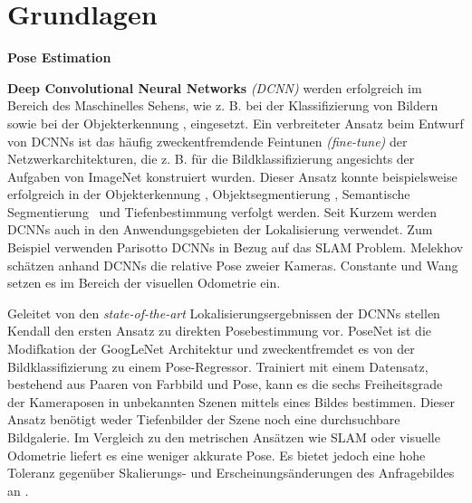 \pagebreak
\section{Grundlagen}





\pagebreak
\textbf{Pose Estimation}

\textbf{Deep Convolutional Neural Networks} \textit{(DCNN)} werden erfolgreich im Bereich des Maschinelles Sehens, wie z. B. bei der Klassifizierung von Bildern \cite{krizhevskyImageNetClassificationDeep2012, simonyanVeryDeepConvolutional2014, heDeepResidualLearning2015} sowie bei der  Objekterkennung \cite{girshickRichFeatureHierarchies2013, renFasterRCNNRealTime2015b, girshickFastRCNN2015},  eingesetzt. 
Ein verbreiteter Ansatz beim Entwurf von DCNNs ist das häufig zweckentfremdende Feintunen \textit{(fine-tune)} der Netzwerkarchitekturen, die z. B. für die Bildklassifizierung angesichts der Aufgaben von ImageNet \cite{russakovskyImageNetLargeScale2014} konstruiert wurden. Dieser Ansatz konnte beispielsweise erfolgreich in der Objekterkennung \cite{girshickFastRCNN2015}, Objektsegmentierung \cite{kokkinosPushingBoundariesBoundary2015, maninisConvolutionalOrientedBoundaries2016}, Semantische Segmentierung \cite{nohLearningDeconvolutionNetwork2015, hazirbasFuseNetIncorporatingDepth2017a} und Tiefenbestimmung \cite{liDepthSurfaceNormal2015} verfolgt werden.
Seit Kurzem werden DCNNs auch in den Anwendungsgebieten der Lokalisierung verwendet. Zum Beispiel verwenden Parisotto \etal\cite{parisottoGlobalPoseEstimation2018} DCNNs in Bezug auf das SLAM Problem. Melekhov \etal\cite{melekhovRelativeCameraPose2017} schätzen anhand DCNNs die relative Pose zweier Kameras. Constante \etal\cite{costanteExploringRepresentationLearning2016} und Wang \etal\cite{wangDeepVOEndtoendVisual2017} setzen es im Bereich der visuellen Odometrie ein.

Geleitet von den \textit{state-of-the-art} Lokalisierungsergebnissen der DCNNs stellen Kendall \etal\cite{kendallPoseNetConvolutionalNetwork2015} den ersten Ansatz zu direkten Posebestimmung  vor. PoseNet \cite{kendallPoseNetConvolutionalNetwork2015} ist die Modifkation der GoogLeNet \cite{szegedyGoingDeeperConvolutions2015} Architektur und zweckentfremdet es von der Bildklassifizierung zu einem Pose-Regressor. Trainiert mit einem Datensatz, bestehend aus Paaren von Farbbild und Pose, kann es die sechs Freiheitsgrade der Kameraposen in unbekannten Szenen mittels eines Bildes bestimmen. Dieser Ansatz benötigt weder Tiefenbilder der Szene noch eine durchsuchbare Bildgalerie. Im Vergleich zu den metrischen Ansätzen wie SLAM oder visuelle Odometrie liefert es eine weniger akkurate Pose. Es bietet jedoch eine hohe Toleranz gegenüber Skalierungs- und Erscheinungsänderungen des Anfragebildes an \cite{piascoSurveyVisualBasedLocalization2018}.

